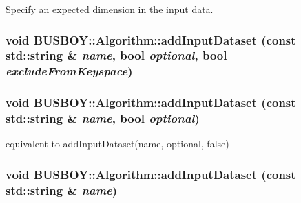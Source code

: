 Specify an expected dimension in the input data. \hypertarget{classBUSBOY_1_1Algorithm_af9887c6a1119a626e16c5ba7202e889b}{
\subsubsection[{addInputDataset}]{\setlength{\rightskip}{0pt plus 5cm}void BUSBOY::Algorithm::addInputDataset (const std::string \& {\em name}, \/  bool {\em optional}, \/  bool {\em excludeFromKeyspace})}}
\label{classBUSBOY_1_1Algorithm_af9887c6a1119a626e16c5ba7202e889b}
\hypertarget{classBUSBOY_1_1Algorithm_a8c4aad6a31a4e5fa6309e530d777209d}{
\subsubsection[{addInputDataset}]{\setlength{\rightskip}{0pt plus 5cm}void BUSBOY::Algorithm::addInputDataset (const std::string \& {\em name}, \/  bool {\em optional})}}
\label{classBUSBOY_1_1Algorithm_a8c4aad6a31a4e5fa6309e530d777209d}


equivalent to {\ttfamily addInputDataset(name, optional, false)} \hypertarget{classBUSBOY_1_1Algorithm_a87b146b82d04e5fa4f312f1d3d66bc59}{
\subsubsection[{addInputDataset}]{\setlength{\rightskip}{0pt plus 5cm}void BUSBOY::Algorithm::addInputDataset (const std::string \& {\em name})}}
\label{classBUSBOY_1_1Algorithm_a87b146b82d04e5fa4f312f1d3d66bc59}


